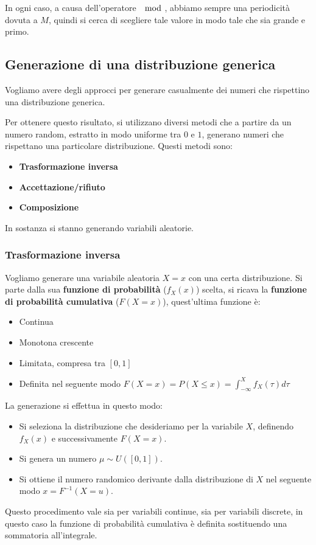 In ogni caso, a causa dell'operatore $\mod$, abbiamo sempre una periodicità dovuta
a $M$, quindi si cerca di scegliere tale valore in modo tale che sia grande e primo.
\subsection{Generazione di una distribuzione generica}
Vogliamo avere degli approcci per generare casualmente dei numeri che rispettino
una distribuzione generica.

Per ottenere questo risultato, si utilizzano diversi metodi che a partire da un
numero random, estratto in modo uniforme tra $0$ e $1$, generano numeri che rispettano
una particolare distribuzione. Questi metodi sono:
\begin{itemize}
    \item \textbf{Trasformazione inversa}
    \item \textbf{Accettazione/rifiuto}
    \item \textbf{Composizione}
\end{itemize}
In sostanza si stanno generando variabili aleatorie.
\subsubsection{Trasformazione inversa}
Vogliamo generare una variabile aleatoria $X = x$ con una certa distribuzione.
Si parte dalla sua \textbf{funzione di probabilità} ($f_X(x)$) scelta, si ricava
la \textbf{funzione di probabilità cumulativa} ($F(X = x)$), quest'ultima funzione è:
\begin{itemize}
    \item Continua
    \item Monotona crescente
    \item Limitata, compresa tra $[0,1]$
    \item Definita nel seguente modo $F(X=x) =P(X \leq x) = \int_{-\infty}^X f_X(\tau) d\tau$
\end{itemize}
La generazione si effettua in questo modo:
\begin{itemize}
    \item Si seleziona la distribuzione che desideriamo per la variabile $X$,
          definendo $f_X(x)$ e successivamente $F(X=x)$.
    \item Si genera un numero $\mu \sim U([0,1])$.
    \item Si ottiene il numero randomico derivante dalla distribuzione di $X$
          nel seguente modo $x = F^{-1}(X=u)$.
\end{itemize}
Questo procedimento vale sia per variabili continue, sia per variabili discrete,
in questo caso la funzione di probabilità cumulativa è definita sostituendo una
sommatoria all'integrale.

